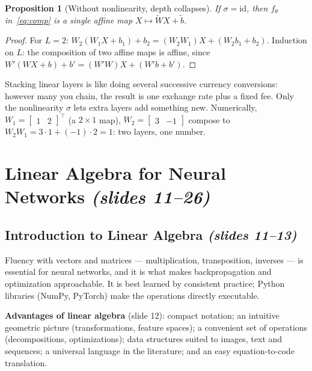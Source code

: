 \documentclass[11pt,a4paper]{article}
\newcommand{\slides}[1]{\texorpdfstring{\emph{(slides #1)}}{(slides #1)}}
\theoremstyle{definition}
\theoremstyle{plain}
\newtheorem{proposition}[definition]{Proposition}
\begin{document}
\begin{proposition}[Without nonlinearity, depth collapses]\label{prop:collapse}
If $\sigma=\mathrm{id}$, then $f_\theta$ in~\eqref{eq:comp} is a single affine map $X\mapsto \widetilde W X+\tilde b$.
\end{proposition}
\begin{proof}
For $L=2$: $W_2(W_1X+b_1)+b_2=(W_2W_1)X+(W_2b_1+b_2)$. Induction on $L$: the composition of two affine maps is affine, since $W'(WX+b)+b'=(W'W)X+(W'b+b')$.
\end{proof}

\begin{intuition}
Stacking linear layers is like doing several successive currency conversions: however many you chain, the result is one exchange rate plus a fixed fee. Only the nonlinearity $\sigma$ lets extra layers add something new. Numerically, $W_1=\begin{bmatrix}1&2\end{bmatrix}^{\!\top}$ (a $2\times1$ map), $W_2=\begin{bmatrix}3&-1\end{bmatrix}$ compose to $W_2W_1=3\cdot1+(-1)\cdot 2=1$: two layers, one number.
\end{intuition}

\section{Linear Algebra for Neural Networks \slides{11--26}}

\subsection{Introduction to Linear Algebra \slides{11--13}}

Fluency with vectors and matrices --- multiplication, transposition, inverses --- is essential for neural networks, and it is what makes backpropagation and optimization approachable. It is best learned by consistent practice; Python libraries (NumPy, PyTorch) make the operations directly executable.

\textbf{Advantages of linear algebra} (slide 12): compact notation; an intuitive geometric picture (transformations, feature spaces); a convenient set of operations (decompositions, optimizations); data structures suited to images, text and sequences; a universal language in the literature; and an easy equation-to-code translation.
\end{document}

